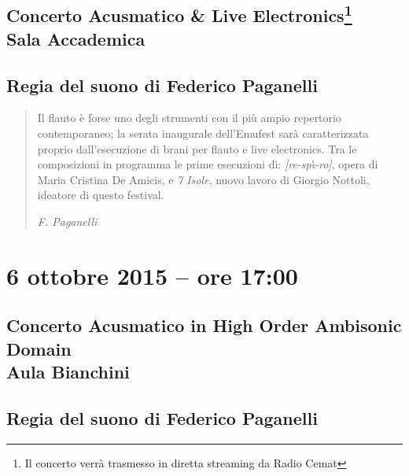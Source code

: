 \documentclass[8pt, twoside, a5paper]{extreport}
\begin{document}
\subsection*{{\small Concerto Acusmatico \& Live Electronics\footnote{ Il concerto verrà trasmesso in diretta streaming da Radio Cemat}} \\
	\textsf{Sala Accademica}}

{\fontsize{30}{30} }

\subsection*{\textsf{Regia del suono di Federico Paganelli}}

\begin{quote}
{\svolk \small
Il flauto è forse uno degli strumenti con il più ampio repertorio contemporaneo; la serata inaugurale dell’Emufest sarà caratterizzata proprio dall’esecuzione di brani per flauto e live electronics.    
Tra le composizioni in programma le prime esecuzioni di: \emph{[re-sp\`{\i}-ro]}, opera di Maria Cristina De Amicis, e  \emph{7 Isole}, nuovo lavoro di Giorgio Nottoli, ideatore di questo festival.}

\emph{F. Paganelli}
\end{quote}


\begin{multicols}{2}




\end{multicols}

\clearpage


\section*{6 ottobre 2015 -- ore 17:00}

\subsection*{{\small Concerto Acusmatico in High Order Ambisonic Domain} \\
	\textsf{Aula Bianchini}}

{\fontsize{30}{30} }

\subsection*{\textsf{Regia del suono di Federico Paganelli}}
\end{document}
